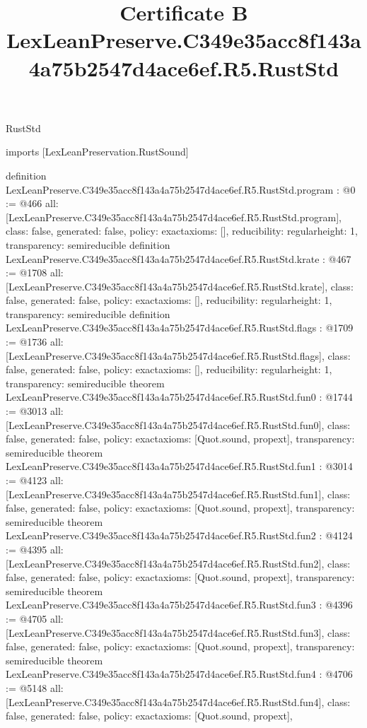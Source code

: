 \begin{lexlean}{RustStd}
\title{Certificate B LexLeanPreserve.C349e35acc8f143a4a75b2547d4ace6ef.R5.RustStd}
\begin{coremodule}
imports [LexLeanPreservation.RustSound]

definition LexLeanPreserve.C349e35acc8f143a4a75b2547d4ace6ef.R5.RustStd.program : @0 := @466 {
  all: [LexLeanPreserve.C349e35acc8f143a4a75b2547d4ace6ef.R5.RustStd.program],
  class: false,
  generated: false,
  policy: exact{axioms: []},
  reducibility: regular{height: 1},
  transparency: semireducible
}
definition LexLeanPreserve.C349e35acc8f143a4a75b2547d4ace6ef.R5.RustStd.krate : @467 := @1708 {
  all: [LexLeanPreserve.C349e35acc8f143a4a75b2547d4ace6ef.R5.RustStd.krate],
  class: false,
  generated: false,
  policy: exact{axioms: []},
  reducibility: regular{height: 1},
  transparency: semireducible
}
definition LexLeanPreserve.C349e35acc8f143a4a75b2547d4ace6ef.R5.RustStd.flags : @1709 := @1736 {
  all: [LexLeanPreserve.C349e35acc8f143a4a75b2547d4ace6ef.R5.RustStd.flags],
  class: false,
  generated: false,
  policy: exact{axioms: []},
  reducibility: regular{height: 1},
  transparency: semireducible
}
theorem LexLeanPreserve.C349e35acc8f143a4a75b2547d4ace6ef.R5.RustStd.fun0 : @1744 := @3013 {
  all: [LexLeanPreserve.C349e35acc8f143a4a75b2547d4ace6ef.R5.RustStd.fun0],
  class: false,
  generated: false,
  policy: exact{axioms: [Quot.sound, propext]},
  transparency: semireducible
}
theorem LexLeanPreserve.C349e35acc8f143a4a75b2547d4ace6ef.R5.RustStd.fun1 : @3014 := @4123 {
  all: [LexLeanPreserve.C349e35acc8f143a4a75b2547d4ace6ef.R5.RustStd.fun1],
  class: false,
  generated: false,
  policy: exact{axioms: [Quot.sound, propext]},
  transparency: semireducible
}
theorem LexLeanPreserve.C349e35acc8f143a4a75b2547d4ace6ef.R5.RustStd.fun2 : @4124 := @4395 {
  all: [LexLeanPreserve.C349e35acc8f143a4a75b2547d4ace6ef.R5.RustStd.fun2],
  class: false,
  generated: false,
  policy: exact{axioms: [Quot.sound, propext]},
  transparency: semireducible
}
theorem LexLeanPreserve.C349e35acc8f143a4a75b2547d4ace6ef.R5.RustStd.fun3 : @4396 := @4705 {
  all: [LexLeanPreserve.C349e35acc8f143a4a75b2547d4ace6ef.R5.RustStd.fun3],
  class: false,
  generated: false,
  policy: exact{axioms: [Quot.sound, propext]},
  transparency: semireducible
}
theorem LexLeanPreserve.C349e35acc8f143a4a75b2547d4ace6ef.R5.RustStd.fun4 : @4706 := @5148 {
  all: [LexLeanPreserve.C349e35acc8f143a4a75b2547d4ace6ef.R5.RustStd.fun4],
  class: false,
  generated: false,
  policy: exact{axioms: [Quot.sound, propext]},
}
\end{coremodule}
\end{lexlean}
